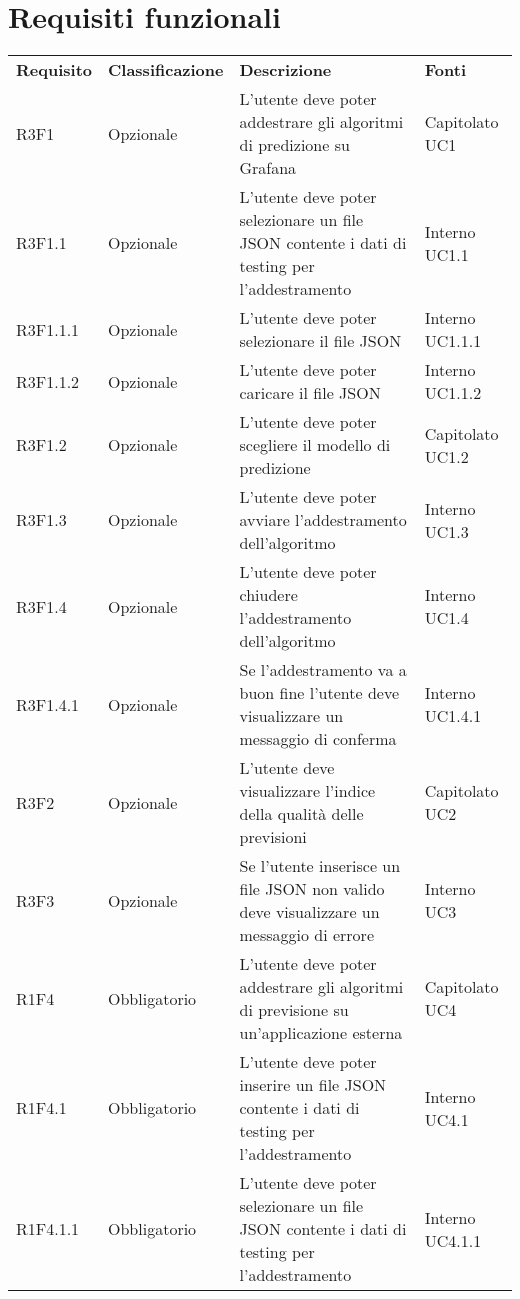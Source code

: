 \section{Requisiti funzionali}
	\begin{longtable} {
		>{}p{24mm} 
		>{}p{32mm}
		>{}p{40mm} 
		>{}p{24.5mm}
		}
	\rowcolor{gray!50}
		\textbf{Requisito} & \textbf{Classificazione} & \textbf{Descrizione} & \textbf{Fonti} 	\TBstrut \\
		R3F1 & Opzionale & L'utente deve poter addestrare gli algoritmi di predizione su Grafana\glo & Capitolato UC1 \TBstrut \\ [2mm]
		R3F1.1 & Opzionale & L'utente deve poter selezionare un file JSON contente i dati di testing per l'addestramento & Interno UC1.1 \TBstrut \\ [2mm]
		R3F1.1.1 & Opzionale & L'utente deve poter selezionare il file JSON & Interno UC1.1.1 \TBstrut \\ [2mm]
		R3F1.1.2 & Opzionale & L'utente deve poter caricare il file JSON & Interno UC1.1.2 \TBstrut \\ [2mm]
		R3F1.2 & Opzionale & L'utente deve poter scegliere il modello di predizione & Capitolato UC1.2 \TBstrut \\ [2mm]
		R3F1.3 & Opzionale & L'utente deve poter avviare l'addestramento dell'algoritmo & Interno UC1.3 \TBstrut \\ [2mm]
		R3F1.4 & Opzionale & L'utente deve poter chiudere l'addestramento dell'algoritmo & Interno UC1.4 \TBstrut \\ [2mm]
		R3F1.4.1 & Opzionale & Se l'addestramento va a buon fine l'utente deve visualizzare un messaggio di conferma & Interno UC1.4.1 \TBstrut \\ [2mm]		
		R3F2 & Opzionale & L'utente deve visualizzare l'indice della qualità delle previsioni & Capitolato UC2 \TBstrut \\ [2mm]
		R3F3 & Opzionale & Se l'utente inserisce un file JSON non valido deve visualizzare un messaggio di errore & Interno UC3 \TBstrut \\ [2mm]		
		R1F4 & Obbligatorio & L'utente deve poter addestrare gli algoritmi di previsione su un'applicazione esterna & Capitolato UC4 \TBstrut \\ [2mm]		
		R1F4.1 & Obbligatorio & L'utente deve poter inserire un file JSON contente i dati di testing per l'addestramento & Interno UC4.1 \TBstrut \\ [2mm]		
		R1F4.1.1 & Obbligatorio & L'utente deve poter selezionare un file JSON contente i dati di testing per l'addestramento & Interno UC4.1.1 \TBstrut \\ [2mm]

\end{longtable}
